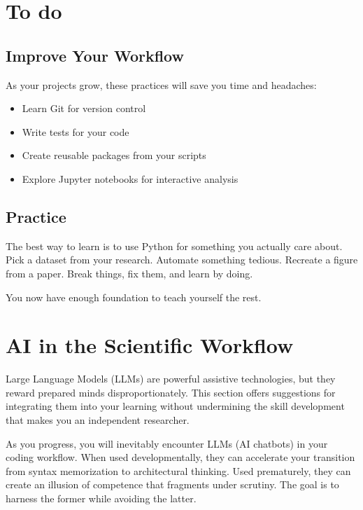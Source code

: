 \section{To do}
\subsection{Improve Your Workflow}

As your projects grow, these practices will save you time and headaches:
\begin{itemize}
    \item Learn Git for version control
    \item Write tests for your code
    \item Create reusable packages from your scripts
    \item Explore Jupyter notebooks for interactive analysis
\end{itemize}

\subsection{Practice}

The best way to learn is to use Python for something you actually care about. Pick a dataset from your research. Automate something tedious. Recreate a figure from a paper. Break things, fix them, and learn by doing.

You now have enough foundation to teach yourself the rest.

\section{AI in the Scientific Workflow}
\label{sec:ai-usage}

\begin{note}
    Large Language Models (LLMs) are powerful assistive technologies, but they reward prepared minds disproportionately. This section offers suggestions for integrating them into your learning without undermining the skill development that makes you an independent researcher.
\end{note}

\noindent As you progress, you will inevitably encounter LLMs (AI chatbots) in your coding workflow. When used developmentally, they can accelerate your transition from syntax memorization to architectural thinking. Used prematurely, they can create an illusion of competence that fragments under scrutiny. The goal is to harness the former while avoiding the latter.

